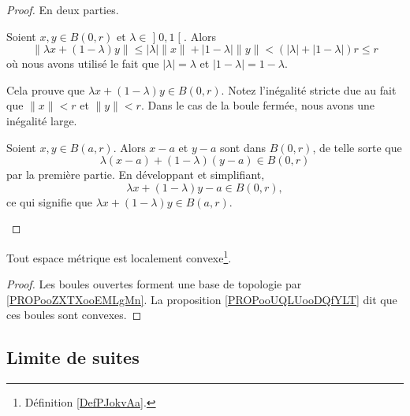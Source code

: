 \begin{proof}
	En deux parties.
	\begin{subproof}
		Soient \( x,y\in B(0,r)\) et \( \lambda\in\mathopen] 0 , 1 \mathclose[\). Alors
		\begin{equation}
			\| \lambda x+(1-\lambda)y \|\leq | \lambda |\| x \|+| 1-\lambda |\| y \|< (| \lambda | +| 1-\lambda |)r\leq r
		\end{equation}
		où nous avons utilisé le fait que \( | \lambda |=\lambda\) et \( | 1-\lambda |=1-\lambda\).

		Cela prouve que \( \lambda x+(1-\lambda)y\in B(0,r)\). Notez l'inégalité stricte due au fait que \( \| x \|<r\) et \( \| y \|<r\). Dans le cas de la boule fermée, nous avons une inégalité large.


		Soient \( x,y\in B(a,r)\). Alors \( x-a\) et \( y-a\) sont dans \( B(0,r)\), de telle sorte que
		\begin{equation}
			\lambda(x-a)+(1-\lambda)(y-a)\in B(0,r)
		\end{equation}
		par la première partie. En développant et simplifiant,
		\begin{equation}
			\lambda x+(1-\lambda)y-a\in B(0,r),
		\end{equation}
		ce qui signifie que \( \lambda x+(1-\lambda)y\in B(a,r)\).
	\end{subproof}
\end{proof}


\begin{proposition}		\label{PROPooBVWIooZocheH}
	Tout espace métrique est localement convexe\footnote{Définition \ref{DefPJokvAa}.}.
\end{proposition}

\begin{proof}
	Les boules ouvertes forment une base de topologie par \ref{PROPooZXTXooEMLgMn}. La proposition \ref{PROPooUQLUooDQfYLT} dit que ces boules sont convexes.
\end{proof}

\subsection{Limite de suites}


